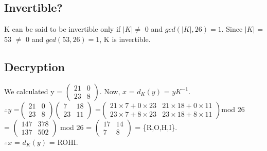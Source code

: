 \documentclass[12pt]{article}
\begin{document}
\begin{large}
\subsection{Invertible?}
K can be said to be invertible only if $|K| \ne$ 0 and $gcd(|K|,26) = 1$. Since $|K|$ = 53 $\ne$ 0 and $gcd(53,26) = 1$, K is invertible.

\subsection{Decryption}
We calculated y
= $\begin{pmatrix}
21&0\\23&8
\end{pmatrix}$. Now, $x$ = $d_K(y)$ = $yK^{-1}$.\\
$\therefore y$
=$\begin{pmatrix}
21&0\\23&8
\end{pmatrix}
\begin{pmatrix}
7&18\\23&11
\end{pmatrix}$
=$\begin{pmatrix}
21\times7+0\times23 & 21\times18+0\times11\\
23\times7+8\times23 & 23\times18+8\times11
\end{pmatrix}$mod 26\\
= $\begin{pmatrix}
147&378\\137&502
\end{pmatrix}$ mod 26
= $\begin{pmatrix}
17&14\\7&8
\end{pmatrix}$ = \{R,O,H,I\}.\\
$\therefore x$ = $d_K(y)$ = ROHI.

\end{large}
\end{document}
